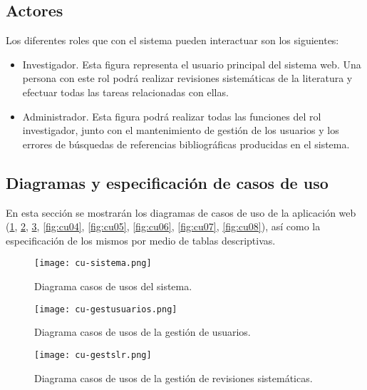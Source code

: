 \subsection{Actores} 
Los diferentes roles que con el sistema pueden interactuar son los siguientes:

\begin{itemize}
	\item Investigador. Esta figura representa el usuario principal del sistema web. Una persona con este rol podrá realizar revisiones sistemáticas de la literatura y efectuar todas las tareas relacionadas con ellas.
	\item Administrador. Esta figura podrá realizar todas las funciones del rol investigador, junto con el mantenimiento de gestión de los usuarios y los errores de búsquedas de referencias bibliográficas producidas en el sistema.
\end{itemize}


\subsection{Diagramas y especificación de casos de uso}
En esta sección se mostrarán los diagramas de casos de uso de la aplicación web (\ref{fig:cu01}, \ref{fig:cu02}, \ref{fig:cu03}, \ref{fig:cu04}, \ref{fig:cu05}, \ref{fig:cu06}, \ref{fig:cu07}, \ref{fig:cu08}), así como la especificación de los mismos por medio de tablas descriptivas.

\begin{figure}[!hpt]
	\begin{center} 
		\texttt{[image: cu-sistema.png]}
		\caption{Diagrama casos de usos del sistema.}
		\label{fig:cu01}
	\end{center}
\end{figure}

\begin{figure}[!hpt]
	\begin{center} 
		\texttt{[image: cu-gestusuarios.png]}
		\caption{Diagrama casos de usos de la gestión de usuarios.}
		\label{fig:cu02}
	\end{center}
\end{figure}

\begin{figure}[!hpt]
	\begin{center}
		\texttt{[image: cu-gestslr.png]}
		\caption{Diagrama casos de usos de la gestión de revisiones sistemáticas.}
		\label{fig:cu03}
	\end{center}
\end{figure}

